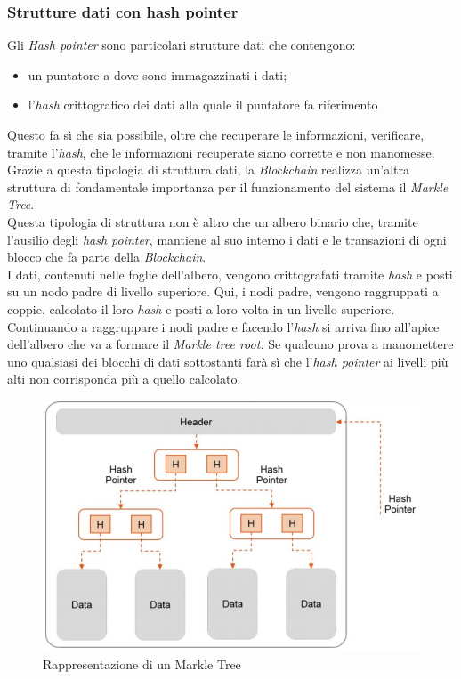 \subsubsection{Strutture dati con hash pointer}
Gli \textit{Hash pointer} sono particolari strutture dati che contengono:
\begin{itemize}
	\item un puntatore a dove sono immagazzinati i dati;
	\item l'\textit{hash} crittografico dei dati alla quale il puntatore fa riferimento
\end{itemize}
Questo fa sì che sia possibile, oltre che recuperare le informazioni, verificare, tramite l'\textit{hash}, che le informazioni recuperate siano corrette e non manomesse.\\
Grazie a questa tipologia di struttura dati, la \textit{Blockchain} realizza un'altra struttura di fondamentale importanza per il funzionamento del sistema il \textit{Markle Tree}.\\
Questa tipologia di struttura non è altro che un albero binario che, tramite l'ausilio degli \textit{hash pointer}, mantiene al suo interno i dati e le transazioni di ogni blocco che fa parte della \textit{Blockchain}.\\
I dati, contenuti nelle foglie dell'albero, vengono crittografati tramite \textit{hash} e posti su un nodo padre di livello superiore. Qui, i nodi padre, vengono raggruppati a coppie, calcolato il loro \textit{hash} e posti a loro volta in un livello superiore. 
Continuando a raggruppare i nodi padre e facendo l'\textit{hash} si arriva fino all'apice dell'albero che va a formare il \textit{Markle tree root.}
Se qualcuno prova a manomettere uno qualsiasi dei blocchi di dati sottostanti farà sì che l'\textit{hash pointer} ai livelli più alti non corrisponda più a quello calcolato.
\begin{figure}[!h]
	\centering
	\includegraphics[scale=0.50]{immagini/markle_tree}
	\caption{Rappresentazione di un Markle Tree}
\end{figure} 
